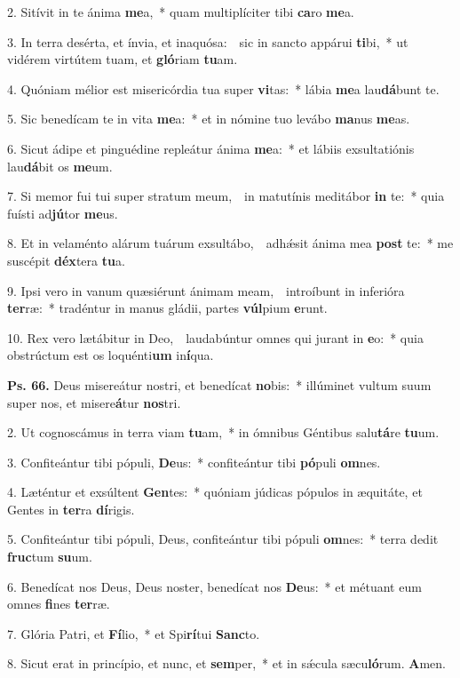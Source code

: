 
2. Sitívit in te ánima \textbf{me}a,~* quam multiplíciter tibi \textbf{ca}ro \textbf{me}a.

3. In terra desérta, et ínvia, et inaquósa:~\GreDagger\ sic in sancto appárui \textbf{ti}bi,~* ut vidérem virtútem tuam, et \textbf{gló}riam \textbf{tu}am.

4. Quóniam mélior est misericórdia tua super \textbf{vi}tas:~* lábia \textbf{me}a lau\textbf{dá}bunt te.

5. Sic benedícam te in vita \textbf{me}a:~* et in nómine tuo levábo \textbf{ma}nus \textbf{me}as.

6. Sicut ádipe et pinguédine repleátur ánima \textbf{me}a:~* et lábiis exsultatiónis lau\textbf{dá}bit os \textbf{me}um.

7. Si memor fui tui super stratum meum,~\GreDagger\ in matutínis meditábor \textbf{in} te:~* quia fuísti ad\textbf{jú}tor \textbf{me}us.

8. Et in velaménto alárum tuárum exsultábo,~\GreDagger\ adh\'{\ae}sit ánima mea \textbf{post} te:~* me suscépit \textbf{déx}tera \textbf{tu}a.

9. Ipsi vero in vanum quæsiérunt ánimam meam,~\GreDagger\ introíbunt in inferióra \textbf{ter}ræ:~* tradéntur in manus gládii, partes \textbf{vúl}pium \textbf{e}runt.

10. Rex vero lætábitur in Deo,~\GreDagger\ laudabúntur omnes qui jurant in \textbf{e}o:~* quia obstrúctum est os loquénti\textbf{um} in\textbf{í}qua.

\textbf{Ps. 66.} Deus misereátur nostri, et benedícat \textbf{no}bis:~* illúminet vultum suum super nos, et misere\textbf{á}tur \textbf{nos}tri.

2. Ut cognoscámus in terra viam \textbf{tu}am,~* in ómnibus Géntibus salu\textbf{tá}re \textbf{tu}um.

3. Confiteántur tibi pópuli, \textbf{De}us:~* confiteántur tibi \textbf{pó}puli \textbf{om}nes.

4. Læténtur et exsúltent \textbf{Gen}tes:~* quóniam júdicas pópulos in æquitáte, et Gentes in \textbf{ter}ra \textbf{dí}rigis.

5. Confiteántur tibi pópuli, Deus, confiteántur tibi pópuli \textbf{om}nes:~* terra dedit \textbf{fruc}tum \textbf{su}um.

6. Benedícat nos Deus, Deus noster, benedícat nos \textbf{De}us:~* et métuant eum omnes \textbf{fi}nes \textbf{ter}ræ.

7. Glória Patri, et \textbf{Fí}lio,~* et Spi\textbf{rí}tui \textbf{Sanc}to.

8. Sicut erat in princípio, et nunc, et \textbf{sem}per,~* et in s\'{\ae}cula sæcu\textbf{ló}rum. \textbf{A}men.
